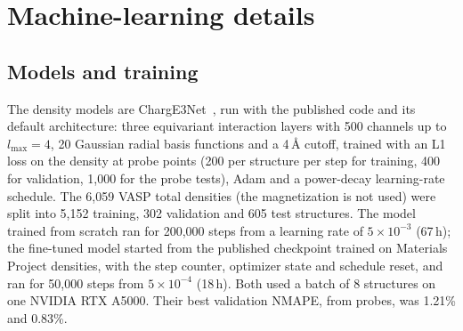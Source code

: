 \documentclass[11pt,a4paper]{article}
\begin{document}


\section{Machine-learning details}
\label{sec:si-ml}

\subsection{Models and training}
The density models are ChargE3Net~\cite{koker2024}, run with the published
code and its default architecture: three equivariant interaction layers with
500 channels up to $l_{\max}=4$, 20 Gaussian radial basis functions and a 4\,\AA{}
cutoff, trained with an L1 loss on the density at
probe points (200 per structure per step for training, 400 for validation,
1,000 for the probe tests), Adam and a power-decay learning-rate schedule. The
6,059 VASP total densities (the magnetization is not used) were split into
5,152 training, 302 validation and 605 test structures. The model
trained from scratch ran for 200,000 steps from a learning rate of
$5\times10^{-3}$ (67\,h); the fine-tuned model started from the published
checkpoint trained on Materials Project densities, with the step counter,
optimizer state and schedule reset, and ran for 50,000 steps from
$5\times10^{-4}$ (18\,h). Both used a batch of 8 structures on one NVIDIA RTX
A5000. Their best validation NMAPE, from probes, was 1.21\% and 0.83\%.
\end{document}
